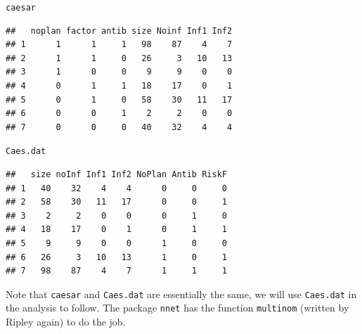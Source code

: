 \documentclass{article}\usepackage[]{graphicx}\usepackage[]{color}
\makeatletter
\newcommand{\hlstd}[1]{\textcolor[rgb]{0.345,0.345,0.345}{#1}}%
\newenvironment{kframe}{%
 \def\at@end@of@kframe{}%
 \ifinner\ifhmode%
  \def\at@end@of@kframe{\end{minipage}}%
  \begin{minipage}{\columnwidth}%
 \fi\fi%
 \def\FrameCommand##1{\hskip\@totalleftmargin \hskip-\fboxsep
 \colorbox{shadecolor}{##1}\hskip-\fboxsep
     \hskip-\linewidth \hskip-\@totalleftmargin \hskip\columnwidth}%
 \MakeFramed {\advance\hsize-\width
   \@totalleftmargin\z@ \linewidth\hsize
   \@setminipage}}%
 {\par\unskip\endMakeFramed%
 \at@end@of@kframe}
\newenvironment{knitrout}{}{} %
\makeatother
\begin{document}
\begin{knitrout}
\color{fgcolor}\begin{kframe}
\begin{alltt}
\hlstd{caesar}
\end{alltt}
\begin{verbatim}
##   noplan factor antib size Noinf Inf1 Inf2
## 1      1      1     1   98    87    4    7
## 2      1      1     0   26     3   10   13
## 3      1      0     0    9     9    0    0
## 4      0      1     1   18    17    0    1
## 5      0      1     0   58    30   11   17
## 6      0      0     1    2     2    0    0
## 7      0      0     0   40    32    4    4
\end{verbatim}
\begin{alltt}
\hlstd{Caes.dat}
\end{alltt}
\begin{verbatim}
##   size noInf Inf1 Inf2 NoPlan Antib RiskF
## 1   40    32    4    4      0     0     0
## 2   58    30   11   17      0     0     1
## 3    2     2    0    0      0     1     0
## 4   18    17    0    1      0     1     1
## 5    9     9    0    0      1     0     0
## 6   26     3   10   13      1     0     1
## 7   98    87    4    7      1     1     1
\end{verbatim}
\end{kframe}
\end{knitrout}

Note that \texttt{caesar} and \texttt{Caes.dat} are essentially the same, we will use \texttt{Caes.dat} in the analysis to follow. The package \texttt{nnet} has the function \texttt{multinom} (written by Ripley again) to do the job. 
\end{document}
